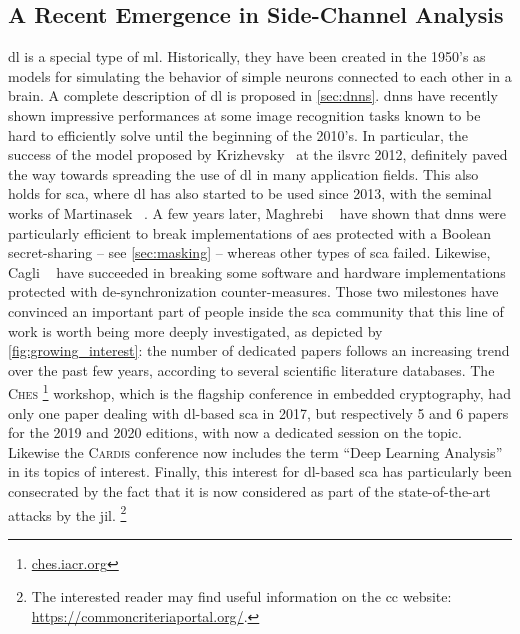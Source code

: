 \subsection{A Recent Emergence in Side-Channel Analysis}
\label{sec:recent_emergence}

\gls{dl} is a special type of \gls{ml}.
Historically, they have been created in the 1950's as models for simulating the behavior of simple neurons connected to each other in a brain.
A complete description of \gls{dl} is proposed in \autoref{sec:dnns}.
\glspl{dnn} have recently shown impressive performances at some image recognition tasks known to be hard to efficiently solve until the beginning of the 2010's.
In particular, the success of the model proposed by Krizhevsky~\cite{alexnet_2012} at the \gls{ilsvrc} 2012, definitely paved the way towards spreading the use of \gls{dl} in many application fields.
This also holds for \gls{sca}, where \gls{dl} has also started to be used since 2013, with the seminal works of Martinasek \etal{}~\cite{martinasek_innovative_2013}.
A few years later, Maghrebi \etal{}~\cite{maghrebi_breaking_2016} have shown that \glspl{dnn} were particularly efficient to break implementations of \gls{aes} protected with a Boolean secret-sharing -- see \autoref{sec:masking} -- whereas other types of \gls{sca} failed.
Likewise, Cagli \etal{}~\cite{cagli_convolutional_2017} have succeeded in breaking some software and hardware implementations protected with de-synchronization counter-measures.
Those two milestones have convinced an important part of people inside the \gls{sca} community that this line of work is worth being more deeply investigated, as depicted by \autoref{fig:growing_interest}: the number of dedicated papers follows an increasing trend over the past few years, according to several scientific literature databases.
The \textsc{Ches}%
\footnote{
	\url{ches.iacr.org}
}
workshop, which is the flagship conference in embedded \gls{cryptography}, had only one paper dealing with \gls{dl}-based \gls{sca} in 2017, but respectively 5 and 6 papers for the 2019 and 2020 editions, with now a dedicated session on the topic.
Likewise the \textsc{Cardis} conference now includes the term ``Deep Learning Analysis'' in its topics of interest.
Finally, this interest for \gls{dl}-based \gls{sca} has particularly been consecrated by the fact that it is now considered as part of the state-of-the-art attacks by the \gls{jil}.%
\footnote{
	The interested reader may find useful information on the \gls{cc} website: \url{https://commoncriteriaportal.org/}.
}

